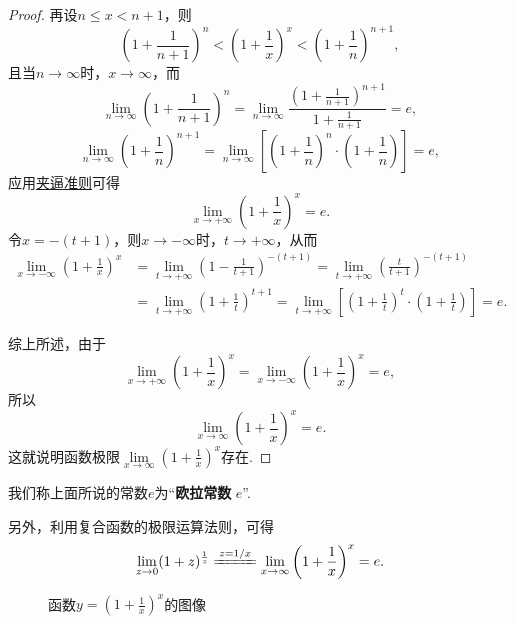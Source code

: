 \begin{example}[重要极限II]
\begin{proof}
再设\(n \leqslant x < n+1\)，则\[
\left(1+\frac{1}{n+1}\right)^n < \left(1+\frac{1}{x}\right)^x < \left(1+\frac{1}{n}\right)^{n+1},
\]且当\(n\to\infty\)时，\(x\to\infty\)，而\[
\lim\limits_{n\to\infty}\left(1+\frac{1}{n+1}\right)^n
=\lim\limits_{n\to\infty}\frac{\left(1+\frac{1}{n+1}\right)^{n+1}}{1+\frac{1}{n+1}} = e,
\]\[
\lim\limits_{n\to\infty}\left(1+\frac{1}{n}\right)^{n+1}
=\lim\limits_{n\to\infty}\left[\left(1+\frac{1}{n}\right)^n\cdot\left(1+\frac{1}{n}\right)\right]=e,
\]应用\hyperref[theorem:极限.夹逼准则]{夹逼准则}可得\[
\lim\limits_{x\to+\infty}\left(1+\frac{1}{x}\right)^x = e.
\]令\(x=-(t+1)\)，则\(x\to-\infty\)时，\(t\to+\infty\)，从而\begin{align*}
\lim\limits_{x\to-\infty}\left(1+\frac{1}{x}\right)^x
&=\lim\limits_{t\to+\infty}\left(1-\frac{1}{t+1}\right)^{-(t+1)}
=\lim\limits_{t\to+\infty}\left(\frac{t}{t+1}\right)^{-(t+1)} \\
&=\lim\limits_{t\to+\infty}\left(1+\frac{1}{t}\right)^{t+1}
=\lim\limits_{t\to+\infty}\left[\left(1+\frac{1}{t}\right)^t\cdot\left(1+\frac{1}{t}\right)\right]=e.
\end{align*}

综上所述，由于\[
\lim\limits_{x\to+\infty}\left(1+\frac{1}{x}\right)^x
= \lim\limits_{x\to-\infty}\left(1+\frac{1}{x}\right)^x
= e,
\]所以\begin{equation}\label{equation:极限.重要极限II}
\lim\limits_{x\to\infty} \left(1+\frac{1}{x}\right)^x = e.
\end{equation}
这就说明函数极限\(\lim\limits_{x\to\infty} \left(1+\frac{1}{x}\right)^x\)存在.
\end{proof}
\end{example}
我们称上面所说的常数\(e\)为“\textbf{欧拉常数} \(e\)”.

另外，利用复合函数的极限运算法则，可得
\begin{equation}
\lim\limits_{z\to0}(1+z)^{\frac{1}{z}}
\xlongequal{z=1/x}
\lim\limits_{x\to\infty}\left(1+\frac{1}{x}\right)^x
= e.
\end{equation}

\begin{figure}[ht]
\centering
{}
\caption{函数\(y=\left(1+\tfrac{1}{x}\right)^x\)的图像}
\label{figure:极限.函数(1+1/x)^x的图像}
\end{figure}

